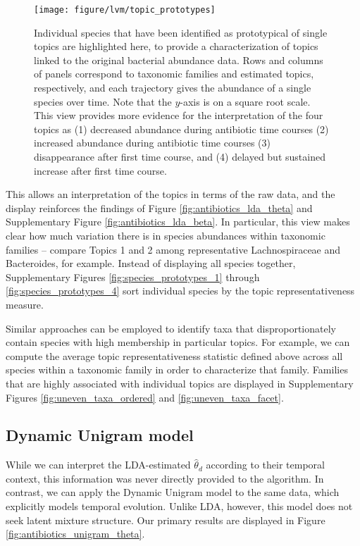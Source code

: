 \begin{figure}
  \centering\texttt{[image: figure/lvm/topic\_prototypes]}
  \caption{Individual species that have been identified as prototypical of
    single topics are highlighted here, to provide a characterization of topics
    linked to the original bacterial abundance data. Rows and columns of panels
    correspond to taxonomic families and estimated topics,
    respectively, and each trajectory gives the abundance of a single species
    over time. Note that the $y$-axis is on a square root scale. This view
    provides more evidence for the interpretation of the four topics as (1)
    decreased abundance during antibiotic time courses (2) increased abundance during
    antibiotic time courses (3) disappearance after first time course, and (4)
    delayed but sustained increase after first time
    course. \label{fig:topic_prototypes}}
\end{figure}

This allows an interpretation of the topics in terms of the raw data, and the
display reinforces the findings of Figure \ref{fig:antibiotics_lda_theta} and
Supplementary Figure \ref{fig:antibiotics_lda_beta}. In particular, this view
makes clear how much variation there is in species abundances within taxonomic
families -- compare Topics 1 and 2 among representative Lachnospiraceae and
Bacteroides, for example. Instead of displaying all species together,
Supplementary Figures \ref{fig:species_prototypes_1} through
\ref{fig:species_prototypes_4} sort individual species by the topic
representativeness measure.

Similar approaches can be employed to identify taxa that disproportionately
contain species with high membership in particular topics. For example, we can
compute the average topic representativeness statistic defined above across all
species within a taxonomic family in order to characterize that family. Families
that are highly associated with individual topics are displayed in Supplementary
Figures \ref{fig:uneven_taxa_ordered} and \ref{fig:uneven_taxa_facet}.

\subsection{Dynamic Unigram model}
\label{sec:antibiotics_unigram}

While we can interpret the LDA-estimated $\hat{\theta}_{d}$ according to their
temporal context, this information was never directly provided to the algorithm.
In contrast, we can apply the Dynamic Unigram model to the same data, which
explicitly models temporal evolution. Unlike LDA, however, this model does not
seek latent mixture structure. Our primary results are displayed in Figure
\ref{fig:antibiotics_unigram_theta}.

